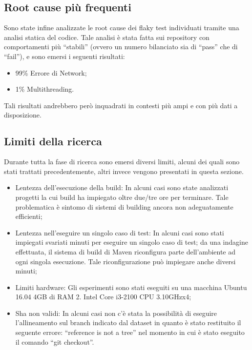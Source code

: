 \subsection{Root cause più frequenti}
Sono state infine analizzate le root cause dei flaky test individuati tramite una
analisi statica del codice. Tale analisi è stata fatta sui repository con comportamenti più “stabili” (ovvero un numero bilanciato sia di “pass” che di “fail”), e sono emersi
i seguenti risultati:
\begin{itemize}
	\item 99\% Errore di Network;
	\item 1\% Multithreading.
\end{itemize}
Tali risultati andrebbero però inquadrati in contesti più ampi e con più dati a disposizione.
\subsection{Limiti della ricerca}
Durante tutta la fase di ricerca sono emersi diversi limiti, alcuni dei quali sono stati trattati precedentemente, altri invece vengono presentati in questa sezione.
\begin{itemize}
\item Lentezza dell’esecuzione della build: In alcuni casi sono state analizzati progetti la cui build ha impiegato oltre due/tre ore per terminare. Tale problematica è sintomo di sistemi di building ancora non adeguatamente efficienti;
\item Lentezza nell’eseguire un singolo caso di test: In alcuni casi sono stati impiegati svariati minuti per eseguire un singolo caso di test; da una indagine effettuata, il sistema di build di Maven riconfigura parte dell’ambiente ad ogni singola esecuzione. Tale riconfigurazione può impiegare anche diversi minuti;
\item Limiti hardware: Gli esperimenti sono stati eseguiti su una macchina Ubuntu 16.04 4GB di RAM 2. Intel Core i3-2100 CPU 3.10GHzx4;
\item Sha non validi: In alcuni casi non c’è stata la possibilità di eseguire l’allineamento sul branch indicato dal dataset in quanto è stato restituito il seguente errore: “reference is not a tree” nel momento in cui è stato eseguito il comando “git checkout”.
\end{itemize}
